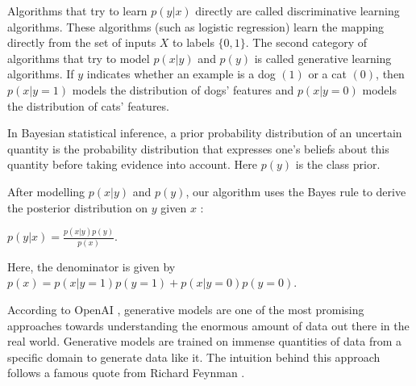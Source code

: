 \begin{onehalfspace}
    Algorithms that try to learn \(p(y|x)\) directly are called discriminative 
    learning algorithms. These algorithms (such as logistic regression) learn 
    the mapping directly from the set of inputs \(X\) to labels \(\{0,1\}\).
    The second category of algorithms that try to model \(p(x|y)\) and \(p(y)\) is 
    called generative learning algorithms. If \(y\) indicates whether an example is 
    a dog \((1)\) or a cat \((0)\),  then \(p(x|y = 1)\) models the distribution of dogs' 
    features and \(p(x|y = 0)\) models the distribution of cats' features.

    In Bayesian statistical inference, a prior probability distribution of an 
    uncertain quantity is the probability distribution that expresses one's 
    beliefs about this quantity before taking evidence into account. Here \(p(y)\) 
    is the class prior.

    After modelling \(p(x|y)\) and \(p(y)\), our algorithm uses the Bayes rule to 
    derive the posterior distribution on \(y\) given \(x\) \cite{ng2002discriminative} :
    \begin{center}
    \(p(y|x) = \frac{p(x|y)p(y)}{p(x)}\).    
    \end{center}
    
    Here, the denominator is given by \(p(x) = p(x|y = 1)p(y = 1) + 
    p(x|y = 0)p(y = 0)\).

    According to OpenAI \cite{openai_genmodels}, generative models are one of the most promising 
    approaches towards understanding the enormous amount of data out there in 
    the real world. Generative models are trained on immense quantities of data 
    from a specific domain to generate data like it. The intuition behind this 
    approach follows a famous quote from Richard Feynman
    \textit{} \cite{quote_rf}.




\end{onehalfspace}


